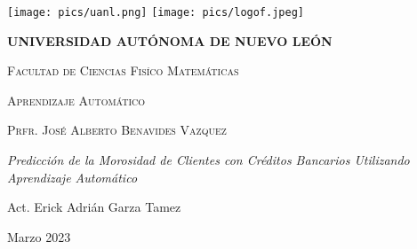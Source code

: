    
    \begin{titlepage}
    \centering
    {\texttt{[image: pics/uanl.png]}
    {\texttt{[image: pics/logof.jpeg]}}
    \par}
    \centering
    \vspace{1cm}
    {\bfseries\LARGE UNIVERSIDAD AUTÓNOMA DE NUEVO LEÓN \par}
    \vspace{1cm}
    {\scshape\Large Facultad de Ciencias Fisíco Matemáticas \par}
    \vspace{0.05cm}
    {\scshape\Large Aprendizaje Automático \par}
    \vspace{0.05cm}
    {\scshape\Large Prfr. José Alberto Benavides Vazquez \par}
    \vspace{1cm}
    {\itshape\LARGE Predicción de la Morosidad de Clientes con Créditos Bancarios Utilizando Aprendizaje Automático \par}
    \vfill
    {\Large Act. Erick Adrián Garza Tamez \par}
    \vfill
    {\Large Marzo 2023 \par}
    \end{titlepage}